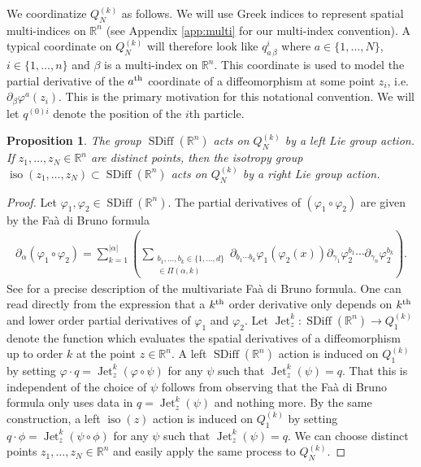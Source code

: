 \documentclass[12pt]{amsart}
\newcommand{\R}{\ensuremath{\mathbb{R}}}
\newtheorem{prop}[thm]{Proposition}
\DeclareMathOperator{\SDiff}{SDiff}
\DeclareMathOperator{\Jet}{Jet}
\DeclareMathOperator{\iso}{iso}
\begin{document}
  We coordinatize $Q^{(k)}_N$ as follows.
  We will use Greek indices to represent spatial
  multi-indices on $\R^n$ (see Appendix \ref{app:multi} for our multi-index convention).
  A typical coordinate on $Q^{(k)}_N$ will therefore look
  like $q^i_{a\,\beta}$ where $a \in \{1,\dots,N\}$, $i \in \{ 1 , \dots, n \}$
  and $\beta$ is a multi-index on $\R^n$.
  This coordinate is used to model the partial derivative of the $a^{\rm th}$ coordinate
  of a diffeomorphism at some point $z_i$, i.e.\ $\partial_\beta \varphi^a(z_i)$.
  This is the primary motivation for this notational convention.
  We will let $q^{(0)i}$ denote the position of the $i$th particle.

  \begin{prop}
    The group $\SDiff(\R^n)$ acts on $Q_N^{(k)}$ by a left Lie group
    action.  If $z_1 ,\dots,z_N \in \R^n$ are distinct points,
    then the isotropy group $\iso(z_1,\dots,z_N) \subset \SDiff(\R^n)$
    acts on $Q_N^{(k)}$ by a right Lie group action.
  \end{prop}
  \begin{proof}
    Let $\varphi_1,\varphi_2 \in \SDiff(\R^n)$.
    The partial derivatives of $(\varphi_1 \circ \varphi_2)$
    are given by the Fa\`a di Bruno formula
    \begin{align*}
      \partial_\alpha( \varphi_1 \circ \varphi_2) = \sum_{k=1}^{|\alpha|}
      \left(
        \sum_{
        \substack{
          b_1,\dots,b_k \in \{1,\dots,d\} \\
          [\gamma_1,\dots,\gamma_k] \in \Pi(\alpha , k)
          }
          }
          \partial_{b_1 \cdots b_k} \varphi_1(\varphi_2(x)) 
          \partial_{\gamma_1} \varphi_2^{b_1} \cdots
          \partial_{\gamma_n} \varphi_2^{b_k}
        \right).
    \end{align*}
    See \cite{ConstantineSavits1996,Jacobs2014b} for a
    precise description of the multivariate Fa\`a di Bruno formula.
    One can read directly from the expression that
    a $k^{\rm th}$ order derivative only depends on $k^{\rm th}$
    and lower order
    partial derivatives of $\varphi_1$ and $\varphi_2$.
    Let $\Jet^k_z: \SDiff(\R^n) \to Q_1^{(k)}$ denote
    the function which evaluates the spatial derivatives
    of a diffeomorphism up to order $k$ at the point $z \in \R^n$.
    A left $\SDiff(\R^n)$ action is induced on $Q_1^{(k)}$ by
    setting $\varphi \cdot q = \Jet^k_z( \varphi \circ \psi)$
    for any $\psi$ such that $\Jet^k_z(\psi) = q$.
    That this is independent of the choice of $\psi$ follows
    from observing that the Fa\`a di Bruno formula
    only uses data in $q = \Jet^k_z(\psi)$ and nothing more.
    By the same construction, a left $\iso(z)$ action is induced
    on $Q_1^{(k)}$ by setting $q \cdot \phi = \Jet^k_z ( \psi \circ \phi)$ for any $\psi$ such that $\Jet^k_z(\psi) = q$.
    We can choose distinct points $z_1,\dots,z_N \in \R^n$
    and easily apply the same process to $Q_N^{(k)}$.
  \end{proof}
  
\end{document}
